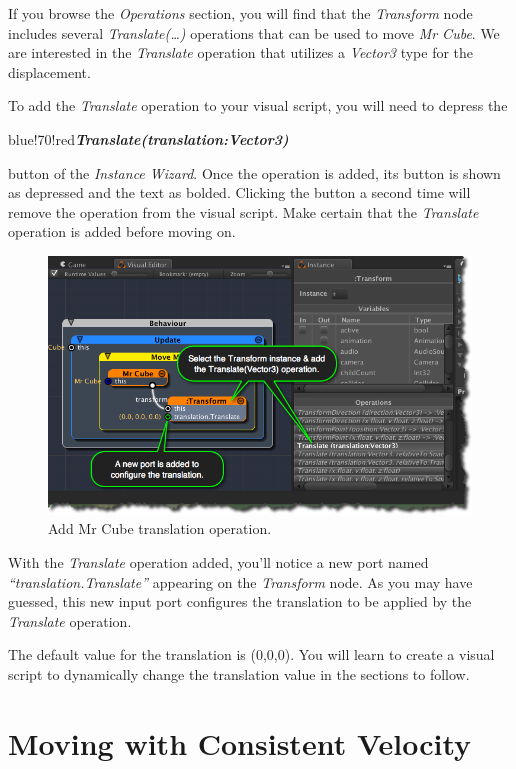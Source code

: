 If you browse the \emph{Operations} section, you will find that the \emph{Transform} node includes several \emph{Translate({\ldots})} operations that can be used to move \emph{Mr Cube}. We are interested in the \emph{Translate} operation that utilizes a \emph{Vector3} type for the displacement.

To add the \emph{Translate} operation to your visual script, you will need to depress the \begin{color}{blue!70!red}\emph{\textbf{Translate(translation:Vector3)}}\end{color} button of the \emph{Instance Wizard}. Once the operation is added, its button is shown as depressed and the text as bolded. Clicking the button a second time will remove the operation from the visual script. Make certain that the \emph{Translate} operation is added before moving on.

\begin{figure}[htbp]
\centering
\includegraphics[keepaspectratio,width=\textwidth,height=0.75\textheight]{add-mr-cube-translation.png}
\caption{Add Mr Cube translation operation.}
\label{add-mr-cube-translation.png}
\end{figure}

With the \emph{Translate} operation added, you'll notice a new port named \emph{``translation.Translate''} appearing on the \emph{Transform} node. As you may have guessed, this new input port configures the translation to be applied by the \emph{Translate} operation.

The default value for the translation is (0,0,0). You will learn to create a visual script to dynamically change the translation value in the sections to follow. 

\section{Moving with Consistent Velocity}
\label{movingwithconsistentvelocity}

